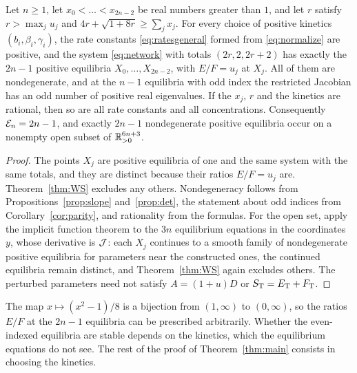 \begin{theorem}\label{thm:count}
Let \(n\ge1\), let \(x_0<\dots<x_{2n-2}\) be real numbers greater than \(1\), and let \(r\)
satisfy \(r>\max_ju_j\) and \(4r+\sqrt{1+8r}\ge\sum_jx_j\). For every choice of positive
kinetics \((b_i,\beta_i,\gamma_i)\), the rate constants \eqref{eq:ratesgeneral} formed from
\eqref{eq:normalize} are positive, and the system \eqref{eq:network} with totals
\((2r,2,2r+2)\) has exactly the \(2n-1\) positive equilibria \(X_0,\dots,X_{2n-2}\), with
\(E/F=u_j\) at \(X_j\). All of them are nondegenerate, and at the \(n-1\) equilibria with odd
index the restricted Jacobian has an odd number of positive real eigenvalues. If the \(x_j\),
\(r\) and the kinetics are rational, then so are all rate constants and all concentrations.
Consequently \(\mathcal E_n=2n-1\), and exactly \(2n-1\) nondegenerate positive equilibria occur on a
nonempty open subset of \(\mathbb R^{6n+3}_{>0}\).
\end{theorem}
\begin{proof}
The points \(X_j\) are positive equilibria of one and the same system with the same totals, and
they are distinct because their ratios \(E/F=u_j\) are. Theorem~\ref{thm:WS} excludes any
others. Nondegeneracy follows from Propositions~\ref{prop:slope} and~\ref{prop:det}, the
statement about odd indices from Corollary~\ref{cor:parity}, and rationality from the
formulas. For the open set, apply the implicit function theorem to the \(3n\) equilibrium
equations in the coordinates \(y\), whose derivative is \(\mathcal J\): each \(X_j\) continues to a
smooth family of nondegenerate positive equilibria for parameters near the constructed ones,
the continued equilibria remain distinct, and Theorem~\ref{thm:WS} again excludes others. The
perturbed parameters need not satisfy \(A=(1+u)D\) or \(S_{\mathrm T}=E_{\mathrm T}+F_{\mathrm T}\).
\end{proof}

The map \(x\mapsto(x^2-1)/8\) is a bijection from \((1,\infty)\) to \((0,\infty)\), so the ratios
\(E/F\) at the \(2n-1\) equilibria can be prescribed arbitrarily. Whether the even-indexed
equilibria are stable depends on the kinetics, which the equilibrium equations do not see. The
rest of the proof of Theorem~\ref{thm:main} consists in choosing the kinetics.
